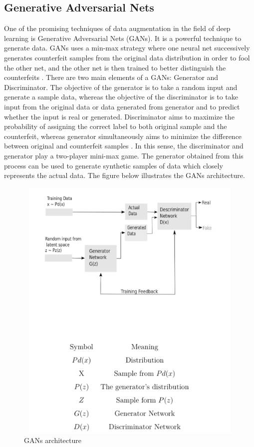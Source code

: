 \subsection{Generative Adversarial Nets}
One of the promising techniques of data augmentation in the field of deep learning is Generative Adversarial Nets (GANs). It is a powerful technique to generate data. GANs uses a min-max strategy where one neural net successively generates counterfeit samples from the original data distribution in order to fool the other net, and the other net is then trained to better distinguish the counterfeits \citep{goodfellow2014generative}. There are two main elements of a GANs: Generator and Discriminator. The objective of the generator is to take a random input and generate a sample data, whereas the objective of the discriminator is to take input from the original data or data generated from generator and to predict whether the input is real or generated. Discriminator aims to maximize the probability of assigning the correct label to both original sample and the counterfeit, whereas generator simultaneously aims to minimize the difference between original and counterfeit samples \citep{goodfellow2014generative}. In this sense, the discriminator and generator play a two-player mini-max game. The generator obtained from this process can be used to generate synthetic samples of data which closely represents the actual data. The figure below illustrates the GANs architecture.

\begin{figure}[ht]
	\begin{center}
		\includegraphics[width=12cm,height=13cm,keepaspectratio]{images/GAN_3.png}
		\caption{GANs architecture}
		\label{fig:GAN}
	\end{center}
\end{figure} 

